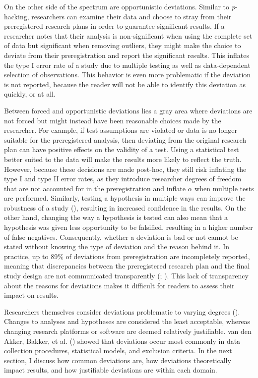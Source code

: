 \documentclass[
  man,
  floatsintext,
  longtable,
  nolmodern,
  notxfonts,
  notimes,
  colorlinks=true,linkcolor=blue,citecolor=blue,urlcolor=blue]{apa7}
\begin{document}
On the other side of the spectrum are opportunistic deviations. Similar
to \emph{p}-hacking, researchers can examine their data and choose to
stray from their preregistered research plans in order to guarantee
significant results. If a researcher notes that their analysis is
non-significant when using the complete set of data but significant when
removing outliers, they might make the choice to deviate from their
preregistration and report the significant results. This inflates the
type I error rate of a study due to multiple testing as well as
data-dependent selection of observations. This behavior is even more
problematic if the deviation is not reported, because the reader will
not be able to identify this deviation as quickly, or at all.

Between forced and opportunistic deviations lies a gray area where
deviations are not forced but might instead have been reasonable choices
made by the researcher. For example, if test assumptions are violated or
data is no longer suitable for the preregistered analysis, then
deviating from the original research plan can have positive effects on
the validity of a test. Using a statistical test better suited to the
data will make the results more likely to reflect the truth. However,
because these decisions are made post-hoc, they still risk inflating the
type I and type II error rates, as they introduce researcher degrees of
freedom that are not accounted for in the preregistration and inflate
\(\alpha\) when multiple tests are performed. Similarly, testing a
hypothesis in multiple ways can improve the robustness of a study
(), resulting in
increased confidence in the results. On the other hand, changing the way
a hypothesis is tested can also mean that a hypothesis was given less
opportunity to be falsified, resulting in a higher number of false
negatives. Consequently, whether a deviation is bad or not cannot be
stated without knowing the type of deviation and the reason behind it.
In practice, up to 89\% of deviations from preregistration are
incompletely reported, meaning that discrepancies between the
preregistered research plan and the final study design are not
communicated transparently (; ). This
lack of transparency about the reasons for deviations makes it difficult
for readers to assess their impact on results.

Researchers themselves consider deviations problematic to varying
degrees ().
Changes to analyses and hypotheses are considered the least acceptable,
whereas changing research platforms or software are deemed relatively
justifiable. van den Akker, Bakker, et al.
() showed that deviations occur most
commonly in data collection procedures, statistical models, and
exclusion criteria. In the next section, I discuss how common deviations
are, how deviations theoretically impact results, and how justifiable
deviations are within each domain.
\end{document}
